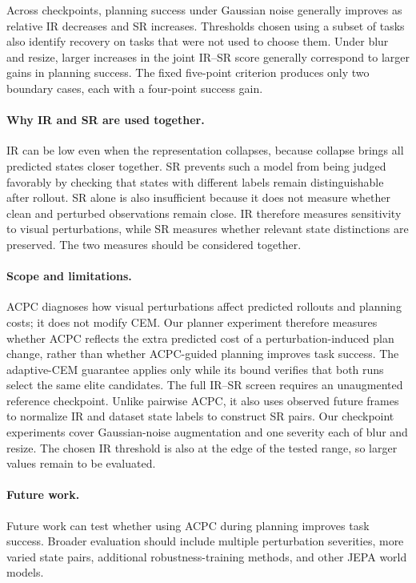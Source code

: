 \documentclass[10pt]{article}
\begin{document}
Across checkpoints, planning success under Gaussian noise generally improves
as relative IR decreases and SR increases. Thresholds chosen using a subset of
tasks also identify recovery on tasks that were not used to choose them. Under
blur and resize, larger increases in the joint IR--SR score generally
correspond to larger gains in planning success. The fixed five-point criterion
produces only two boundary cases, each with a four-point success gain.

\paragraph{Why IR and SR are used together.}
IR can be low even when the representation collapses, because collapse brings
all predicted states closer together. SR prevents such a model from being
judged favorably by checking that states with different labels remain
distinguishable after rollout. SR alone is also insufficient because it does
not measure whether clean and perturbed observations remain close. IR
therefore measures sensitivity to visual perturbations, while SR measures
whether relevant state distinctions are preserved. The two measures should be
considered together.

\paragraph{Scope and limitations.}
ACPC diagnoses how visual perturbations affect predicted rollouts and planning
costs; it does not modify CEM. Our planner experiment therefore measures
whether ACPC reflects the extra predicted cost of a perturbation-induced plan
change, rather than whether ACPC-guided planning improves task success. The
adaptive-CEM guarantee applies only while its bound verifies that both runs
select the same elite candidates. The full IR--SR screen requires an
unaugmented reference checkpoint. Unlike pairwise ACPC, it also uses observed
future frames to normalize IR and dataset state labels to construct SR pairs.
Our checkpoint experiments cover Gaussian-noise augmentation and one severity
each of blur and resize. The chosen IR threshold is also at the edge of the
tested range, so larger values remain to be evaluated.

\paragraph{Future work.}
Future work can test whether using ACPC during planning improves task success.
Broader evaluation should include multiple perturbation severities, more
varied state pairs, additional robustness-training methods, and other JEPA
world models.
\end{document}
